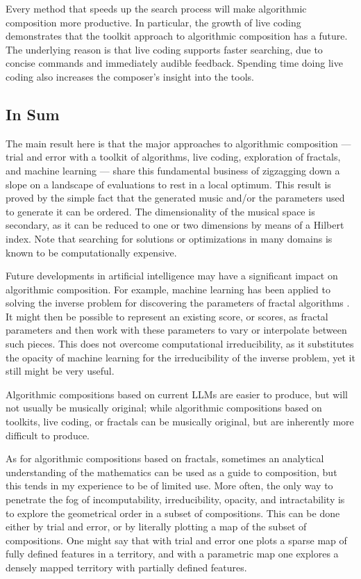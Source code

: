 \documentclass[11pt]{scrartcl}
\begin{document}
Every method that speeds up the search process will make algorithmic composition more productive. In particular, the growth of live coding demonstrates that the toolkit approach to algorithmic composition has a future. The underlying reason is that live coding supports faster searching, due to concise commands and immediately audible feedback. Spending time doing live coding also increases the composer's insight into the tools.

\subsection*{In Sum}

The main result here is that the major approaches to algorithmic composition --- trial and error with a toolkit of algorithms, live coding, exploration of fractals, and machine learning --- share this fundamental business of zigzagging down a slope on a landscape of evaluations to rest in a local optimum. This result is proved  by the simple fact that the generated music and/or the parameters used to generate it can be ordered. The dimensionality of the musical space is secondary, as it can be reduced to one or two dimensions by means of a Hilbert index. Note that searching for solutions or optimizations in many domains is known to be computationally expensive.

Future developments in artificial intelligence may have a significant impact on algorithmic composition. For example, machine learning has been applied to solving the inverse problem for discovering the parameters of fractal algorithms \parencite{tu2023learning}. It might then be possible to represent an existing score, or scores, as fractal parameters and then work with these parameters to vary or interpolate between such pieces. This does not overcome computational irreducibility, as it substitutes the opacity of machine learning for the irreducibility of the inverse problem, yet it still might be very useful.

 Algorithmic compositions based on current LLMs are easier to produce, but will not usually be musically original; while algorithmic compositions based on toolkits, live coding, or fractals can be musically original, but are inherently more difficult to produce.

As for algorithmic compositions based on fractals, sometimes an analytical understanding of the mathematics can be used as a guide to composition, but this tends in my experience to be of limited use. More often, the only way to penetrate the fog of incomputability, irreducibility, opacity, and intractability is to explore the geometrical order in a subset of compositions. This can be done either by trial and error, or by literally plotting a map of the subset of compositions. One might say that with trial and error one plots a sparse map of fully defined features in a territory, and with a parametric map one explores a densely mapped territory with partially defined features.
\end{document}
